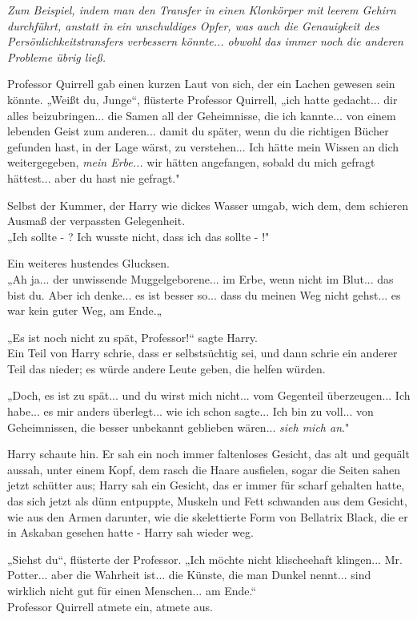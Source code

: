 {\emph{Zum Beispiel, indem man den Transfer in einen Klonkörper mit leerem Gehirn durchführt, anstatt in ein unschuldiges Opfer, was auch die Genauigkeit des Persönlichkeitstransfers verbessern könnte... obwohl das immer noch die anderen Probleme übrig ließ.}

Professor Quirrell gab einen kurzen Laut von sich, der ein Lachen gewesen sein könnte. „Weißt du, Junge“, flüsterte Professor Quirrell, „ich hatte gedacht... dir alles beizubringen... die Samen all der Geheimnisse, die ich kannte... von einem lebenden Geist zum anderen... damit du später, wenn du die richtigen Bücher gefunden hast, in der Lage wärst, zu verstehen... Ich hätte mein Wissen an dich weitergegeben, \emph{mein Erbe...} wir hätten angefangen, sobald du mich gefragt hättest... aber du hast nie gefragt."

Selbst der Kummer, der Harry wie dickes Wasser umgab, wich dem, dem schieren Ausmaß der verpassten Gelegenheit.\\ „Ich sollte - ? Ich wusste nicht, dass ich das sollte - !"

Ein weiteres hustendes Glucksen.\\ „Ah ja... der unwissende Muggelgeborene... im Erbe, wenn nicht im Blut... das bist du. Aber ich denke... es ist besser so... dass du meinen Weg nicht gehst... es war kein guter Weg, am Ende.„

„Es ist noch nicht zu spät, Professor!“ sagte Harry.\\ Ein Teil von Harry schrie, dass er selbstsüchtig sei, und dann schrie ein anderer Teil das nieder; es würde andere Leute geben, die helfen würden.

„Doch, es ist zu spät... und du wirst mich nicht... vom Gegenteil überzeugen... Ich habe... es mir anders überlegt... wie ich schon sagte... Ich bin zu voll... von Geheimnissen, die besser unbekannt geblieben wären... \emph{sieh mich an}."

Harry schaute hin. Er sah ein noch immer faltenloses Gesicht, das alt und gequält aussah, unter einem Kopf, dem rasch die Haare ausfielen, sogar die Seiten sahen jetzt schütter aus; Harry sah ein Gesicht, das er immer für scharf gehalten hatte, das sich jetzt als dünn entpuppte, Muskeln und Fett schwanden aus dem Gesicht, wie aus den Armen darunter, wie die skelettierte Form von Bellatrix Black, die er in Askaban gesehen hatte - Harry sah wieder weg.

„Siehst du“, flüsterte der Professor. „Ich möchte nicht klischeehaft klingen... Mr. Potter... aber die Wahrheit ist... die Künste, die man Dunkel nennt... sind wirklich nicht gut für einen Menschen... am Ende.“\\ Professor Quirrell atmete ein, atmete aus.

}
